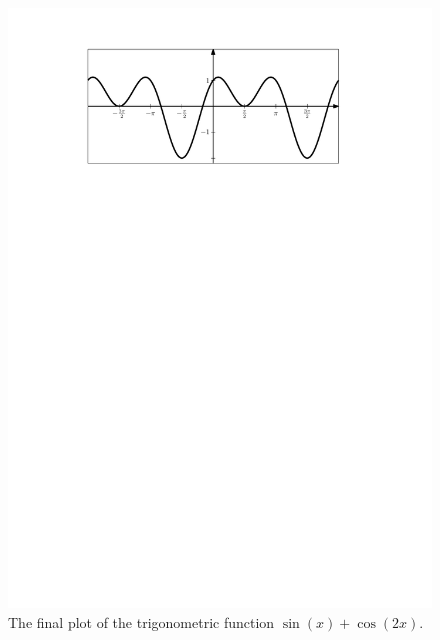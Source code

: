 \documentclass{article}
\begin{document}
\begin{figure}[h]
   \begin{center}
      \includegraphics[scale=.7]{trig.pdf}
   \end{center}
   \caption{The final plot of the trigonometric function $\sin(x) + \cos(2x)$.}
   \label{fig:trig}
\end{figure}

\printbibliography
\end{document}

